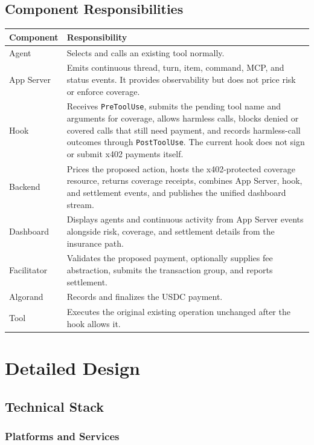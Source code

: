\documentclass[11pt]{article}
\begin{document}
\subsection{Component Responsibilities}

\begin{tabularx}{\textwidth}{@{}lX@{}}
\toprule
\textbf{Component} & \textbf{Responsibility} \\
\midrule
Agent &
Selects and calls an existing tool normally. \\
App Server &
Emits continuous thread, turn, item, command, MCP, and status events. It
provides observability but does not price risk or enforce coverage. \\
Hook &
Receives \texttt{PreToolUse}, submits the pending tool name and arguments for
coverage, allows harmless calls, blocks denied or covered calls that still need
payment, and records harmless-call outcomes through \texttt{PostToolUse}. The
current hook does not sign or submit x402 payments itself. \\
Backend &
Prices the proposed action, hosts the x402-protected coverage resource, returns
coverage receipts, combines App Server, hook, and settlement events, and
publishes the unified dashboard stream. \\
Dashboard &
Displays agents and continuous activity from App Server events alongside risk,
coverage, and settlement details from the insurance path. \\
Facilitator &
Validates the proposed payment, optionally supplies fee abstraction, submits
the transaction group, and reports settlement. \\
Algorand &
Records and finalizes the USDC payment. \\
Tool &
Executes the original existing operation unchanged after the hook allows
it. \\
\bottomrule
\end{tabularx}

\section{Detailed Design}

\subsection{Technical Stack}

\subsubsection{Platforms and Services}
\end{document}
